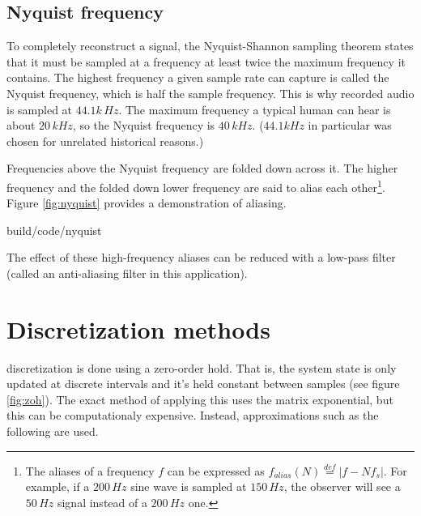 \subsection{Nyquist frequency}

To completely reconstruct a signal, the Nyquist-Shannon sampling theorem states
that it must be sampled at a frequency at least twice the maximum frequency it
contains. The highest frequency a given sample rate can capture is called the
Nyquist frequency, which is half the sample frequency. This is why recorded
audio is sampled at $44.1k\,Hz$. The maximum frequency a typical human can hear
is about $20\,kHz$, so the Nyquist frequency is $40\,kHz$. ($44.1kHz$ in
particular was chosen for unrelated historical reasons.)

Frequencies above the Nyquist frequency are folded down across it. The higher
frequency and the folded down lower frequency are said to alias each
other\footnote{The aliases of a frequency $f$ can be expressed as
$f_{alias}(N) \stackrel{def}{=} |f - Nf_s|$. For example, if a $200\,Hz$ sine
wave is sampled at $150\,Hz$, the \gls{observer} will see a $50\,Hz$ signal
instead of a $200\,Hz$ one.}. Figure \ref{fig:nyquist} provides a demonstration
of aliasing.

\begin{svg}{build/code/nyquist}
  \caption{The samples of two sine waves can be identical when at least one of
    them is at a frequency above half the sample rate. In this case, the $2\,Hz$
    sine wave is above the Nyquist frequency $1.5\,Hz$.}
  \label{fig:nyquist}
\end{svg}

The effect of these high-frequency aliases can be reduced with a low-pass filter
(called an anti-aliasing filter in this application).

\section{Discretization methods} \label{sec:discretization_methods}

\Gls{discretization} is done using a zero-order hold. That is, the \gls{system}
\gls{state} is only updated at discrete intervals and it's held constant between
samples (see figure \ref{fig:zoh}). The exact method of applying this uses the
matrix exponential, but this can be computationaly expensive. Instead,
approximations such as the following are used.

